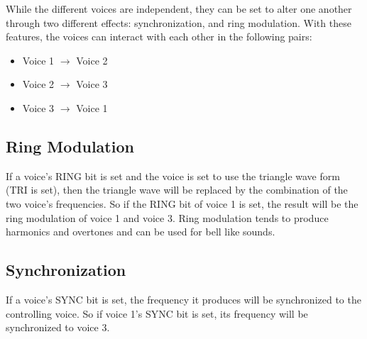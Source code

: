 While the different voices are independent, they can be set to alter one another through two different effects: synchronization, and ring modulation. With these features, the voices can interact with each other in the following pairs:

\begin{itemize}
\item Voice 1 $\rightarrow$ Voice 2
\item Voice 2 $\rightarrow$ Voice 3
\item Voice 3 $\rightarrow$ Voice 1
\end{itemize}

\subsection{Ring Modulation}

If a voice's RING bit is set and the voice is set to use the triangle wave form (TRI is set), then the triangle wave will be replaced by the combination of the two voice's frequencies. So if the RING bit of voice 1 is set, the result will be the ring modulation of voice 1 and voice 3. Ring modulation tends to produce harmonics and overtones and can be used for bell like sounds.

\subsection{Synchronization}

If a voice's SYNC bit is set, the frequency it produces will be synchronized to the controlling voice. So if voice 1's SYNC bit is set, its frequency will be synchronized to voice 3.
